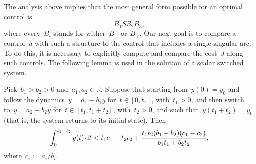The analysis above implies that the most general form possible for an optimal control is
\begin{equation} \label{eq:mosyfr}
	B_1 S B_2 B_3,
\end{equation}
where every~$B_i$ stands for wither~$B_-$ or~$B_+$. 
Our  next goal is to compare a control~$u$ with such a structure to the control that includes a single singular arc. 
To do this, it is necessary to explicitly compute and compare the cost~$J$ along such controls. 
The following lemma is used in the solution of a scalar switched system. 
%
\begin{lemma}\label{lem:vsimprr}
	Pick~$b_1>b_2>0$ and~$a_1,a_2 \in \mathbb{R}$.  
	Suppose that starting  from~$y(0)=y_0$ and follow the dynamics~$\dot y=a_1  -b_1  y$ for~$t\in[0,t_1]$, with~$t_1>0$, and then switch to~$\dot y=a_2   -b_2  y$ for~$t\in [t_1,t_1+t_2]$, with~$t_2>0$,  and such that~$y(t_1+t_2)=y_0$  (that is, the system returns to its initial state).
	Then
		\begin{equation}\label{eq:redp}
			\int _{0}^{t_1+t_2} y(t) \mathop{}\!\mathrm{d}  t <
			t_1 c_1+t_2 c_2
			+ \frac{t_1 t_2 (b_1-b_2)(c_1-c_2)}{b_1 t_1+b_2 t_2},
		\end{equation}
	where~$c_i:=a_i/b_i$.
\end{lemma}

